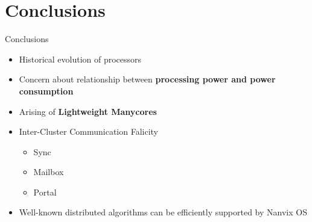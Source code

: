 \section{Conclusions}

	\begin{frame}[fragile]{Conclusions}
		\begin{itemize}
			\item Historical evolution of processors
			\item Concern about relationship between \textbf{processing power and power consumption}
			\item Arising of \textbf{Lightweight Manycores}
			\item Inter-Cluster Communication Falicity
			\begin{itemize}
				\item Sync
				\item Mailbox
				\item Portal
			\end{itemize}
			\item Well-known distributed algorithms can be efficiently supported by Nanvix OS 
		\end{itemize}
		
	\end{frame}

